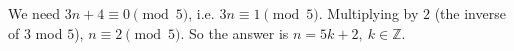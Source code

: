 We need $3n+4\equiv0\pmod5$, i.e. $3n\equiv1\pmod5$. Multiplying by $2$ (the inverse of $3$ mod $5$), $n\equiv2\pmod5$. So the answer is $\boxed{n=5k+2,\ k\in\mathbb Z}$.
